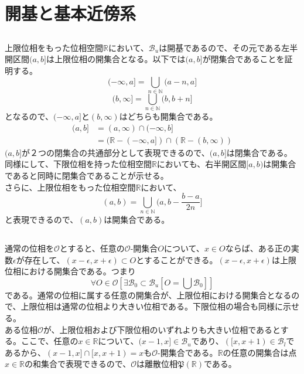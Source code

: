 \documentclass{jsarticle}
\begin{document}
\section{開基と基本近傍系}

\subsection{}
上限位相をもった位相空間$\mathbb{R}$において、$\mathcal{B}_u$は開基であるので、その元である左半開区間$(a,b]$は上限位相の開集合となる。以下では$(a,b]$が閉集合であることを証明する。
\[(-\infty,a] =\bigcup_{n\in\mathbb{N}}(a-n,a]\]
\[(b,\infty]=\bigcup_{n\in\mathbb{N}}(b,b+n]\]
となるので、$(-\infty,a]$と$(b,\infty)$はどちらも開集合である。
\begin{align*}
(a,b]&=(a,\infty)\cap(-\infty,b]\\
&=(\mathbb{R}-(-\infty,a])\cap(\mathbb{R}-(b,\infty))
\end{align*}
$(a,b]$が２つの閉集合の共通部分として表現できるので、$(a,b]$は閉集合である。\\
同様にして、下限位相を持った位相空間$\mathbb{R}$においても、右半開区間$[a,b)$は開集合であると同時に閉集合であることが示せる。\\
さらに、上限位相をもった位相空間$\mathbb{R}$において、
\[(a,b)=\bigcup_{n\in\mathbb{N}}(a, b-\frac{b-a}{2n}]\]
と表現できるので、$(a,b)$は開集合である。

\subsection{}
通常の位相を$\mathcal{O}$とすると、任意の$\mathcal{O}$-開集合$O$について、$x\in O$ならば、ある正の実数$\epsilon$が存在して、$(x-\epsilon,x+\epsilon)\subset O$とすることができる。$(x-\epsilon,x+\epsilon)$は上限位相における開集合である。つまり
\[\forall O\in\mathcal{O}[\exists \mathcal{B}_0\subset \mathcal{B}_u[O=\bigcup\mathcal{B}_0]]\]
である。通常の位相に属する任意の開集合が、上限位相における開集合となるので、上限位相は通常の位相より大きい位相である。下限位相の場合も同様に示せる。\\
ある位相$\mathcal{O}$が、上限位相および下限位相のいずれよりも大きい位相であるとする。ここで、任意の$x\in\mathbb{R}$について、$(x-1,x]\in\mathcal{B}_u$であり、$([x,x+1)\in\mathcal{B}_l$であるから、$(x-1,x]\cap[x,x+1)=x$も$\mathcal{O}$-開集合である。$\mathbb{R}$の任意の開集合は点$x\in\mathbb{R}$の和集合で表現できるので、$\mathcal{O}$は離散位相$\mathfrak{P}(\mathbb{R})$である。
\end{document}
